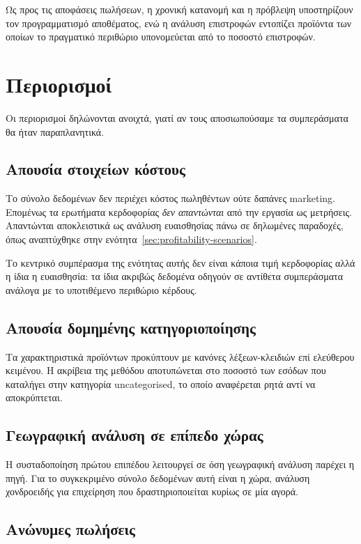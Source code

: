 Ως προς τις αποφάσεις πωλήσεων, η χρονική κατανομή και η πρόβλεψη υποστηρίζουν
τον προγραμματισμό αποθέματος, ενώ η ανάλυση επιστροφών εντοπίζει προϊόντα των
οποίων το πραγματικό περιθώριο υπονομεύεται από το ποσοστό επιστροφών.

\section{Περιορισμοί}

Οι περιορισμοί δηλώνονται ανοιχτά, γιατί αν τους αποσιωπούσαμε τα συμπεράσματα
θα ήταν παραπλανητικά.

\subsection{Απουσία στοιχείων κόστους}

Το σύνολο δεδομένων δεν περιέχει κόστος πωληθέντων ούτε δαπάνες marketing.
Επομένως τα ερωτήματα κερδοφορίας \emph{δεν απαντώνται} από την εργασία ως
μετρήσεις. Απαντώνται αποκλειστικά ως ανάλυση ευαισθησίας πάνω σε δηλωμένες
παραδοχές, όπως αναπτύχθηκε στην ενότητα~\ref{sec:profitability-scenarios}.

Το κεντρικό συμπέρασμα της ενότητας αυτής δεν είναι κάποια τιμή κερδοφορίας
αλλά η ίδια η ευαισθησία: τα ίδια ακριβώς δεδομένα οδηγούν σε αντίθετα
συμπεράσματα ανάλογα με το υποτιθέμενο περιθώριο κέρδους.

\subsection{Απουσία δομημένης κατηγοριοποίησης}

Τα χαρακτηριστικά προϊόντων προκύπτουν με κανόνες λέξεων-κλειδιών επί ελεύθερου
κειμένου. Η ακρίβεια της μεθόδου αποτυπώνεται στο ποσοστό των εσόδων που
καταλήγει στην κατηγορία \textenglish{uncategorised}, το οποίο αναφέρεται
ρητά αντί να αποκρύπτεται.

\subsection{Γεωγραφική ανάλυση σε επίπεδο χώρας}

Η συσταδοποίηση πρώτου επιπέδου λειτουργεί σε όση γεωγραφική ανάλυση παρέχει η
πηγή. Για το συγκεκριμένο σύνολο δεδομένων αυτή είναι η χώρα, ανάλυση χονδροειδής
για επιχείρηση που δραστηριοποιείται κυρίως σε μία αγορά.

\subsection{Ανώνυμες πωλήσεις}

